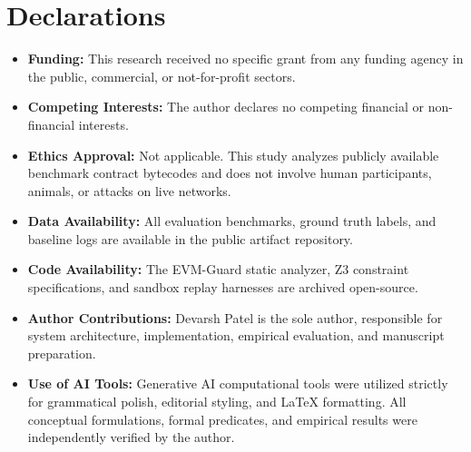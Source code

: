\documentclass[pdflatex,sn-mathphys]{sn-jnl}
\theoremstyle{thmstyleone}
\theoremstyle{thmstyletwo}
\begin{document}
\section*{Declarations}
\begin{itemize}
    \item \textbf{Funding:} This research received no specific grant from any funding agency in the public, commercial, or not-for-profit sectors.
    \item \textbf{Competing Interests:} The author declares no competing financial or non-financial interests.
    \item \textbf{Ethics Approval:} Not applicable. This study analyzes publicly available benchmark contract bytecodes and does not involve human participants, animals, or attacks on live networks.
    \item \textbf{Data Availability:} All evaluation benchmarks, ground truth labels, and baseline logs are available in the public artifact repository.
    \item \textbf{Code Availability:} The EVM-Guard static analyzer, Z3 constraint specifications, and sandbox replay harnesses are archived open-source.
    \item \textbf{Author Contributions:} Devarsh Patel is the sole author, responsible for system architecture, implementation, empirical evaluation, and manuscript preparation.
    \item \textbf{Use of AI Tools:} Generative AI computational tools were utilized strictly for grammatical polish, editorial styling, and LaTeX formatting. All conceptual formulations, formal predicates, and empirical results were independently verified by the author.
\end{itemize}


\end{document}

